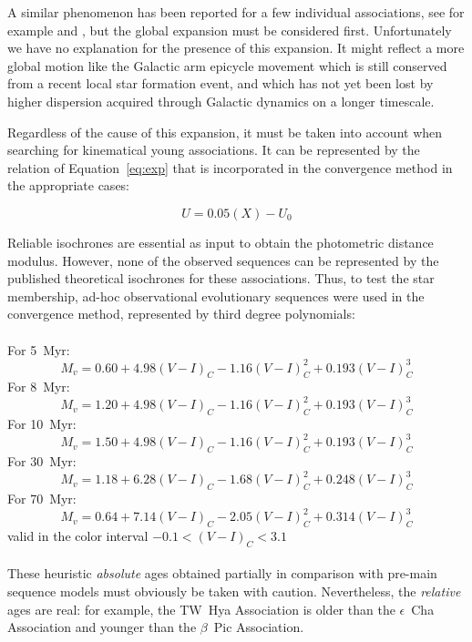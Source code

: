 \documentclass[11pt,twoside]{book}
\begin{document}
A similar phenomenon has been reported for a few individual
associations, see for example \citet{mamajek05} and \citet{bobylev07},
but the global expansion must be considered first.  Unfortunately we
have no explanation for the presence of this expansion.  It might
reflect a more global motion like the Galactic arm epicycle movement
which is still conserved from a recent local star formation event, and
which has not yet been lost by higher dispersion acquired through
Galactic dynamics on a longer timescale.

Regardless of the cause of this expansion, it must be taken into account
when searching for kinematical young associations.
It can be represented by the relation of  Equation~\ref{eq:exp} that is
incorporated in the convergence method in the appropriate cases:

\begin{equation}
\label{eq:exp}
U = 0.05 (X) - U_0
\end{equation}


Reliable isochrones are essential as input to obtain the photometric distance modulus.
However, none of the observed sequences can be represented by the published
theoretical isochrones for these associations.
Thus, to test the star membership, ad-hoc
observational evolutionary sequences were used in the convergence method,
represented by third degree polynomials:\\
\\
For 5~Myr:
\begin{equation}
\label{eq:iso5}
M_v = 0.60 + 4.98(V-I)_C - 1.16(V-I)_C^2 +0.193(V-I)_C^3
\end{equation}
For 8~Myr:
\begin{equation}
\label{eq:iso8}
M_v = 1.20 + 4.98(V-I)_C - 1.16(V-I)_C^2 +0.193(V-I)_C^3
\end{equation}
For 10~Myr:
\begin{equation}
\label{eq:iso10}
M_v = 1.50 + 4.98(V-I)_C - 1.16(V-I)_C^2 + 0.193(V-I)_C^3
\end{equation}
For 30~Myr:
\begin{equation}
\label{eq:iso30}
M_v = 1.18 + 6.28(V-I)_C - 1.68(V-I)_C^2 + 0.248(V-I)_C^3
\end{equation}
For 70~Myr:
\begin{equation}
\label{eq:iso70}
M_v = 0.64 + 7.14(V-I)_C - 2.05(V-I)_C^2 + 0.314(V-I)_C^3
\end{equation}
valid in the color interval $-0.1 < (V-I)_C < 3.1$
\\
\\
These heuristic {\sl absolute} ages obtained partially in comparison  with
pre-main sequence models \citep{siess00} must obviously be taken with caution.
Nevertheless, the {\sl relative} ages  are real: for example,
the TW~Hya Association is older than the  $\epsilon$~Cha Association and younger
than the $\beta$~Pic Association.
\end{document}
